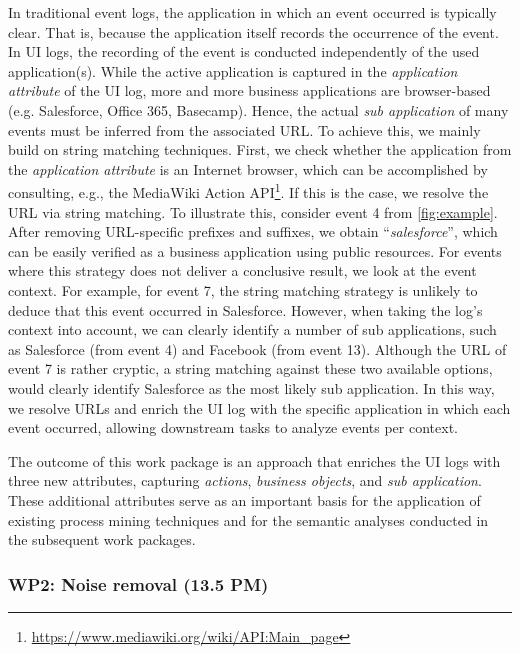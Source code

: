 In traditional event logs, the application in which an event occurred is typically clear. That is, because the application itself records the occurrence of the event. In UI logs, the recording of the event is conducted independently of the used application(s). While the active application is captured in the \textit{application attribute} of the UI log, more and more business applications are browser-based (e.g. Salesforce, Office 365, Basecamp). Hence, the actual \textit{sub application} of many events must be inferred from the associated URL. To achieve this, we mainly build on string matching techniques. First, we check whether the application from the \textit{application attribute} is an Internet browser, which can be accomplished by consulting, e.g., the 
MediaWiki Action API\footnote{\url{https://www.mediawiki.org/wiki/API:Main_page}}. If this is the case, we resolve the URL via string matching. To illustrate this, consider event 4 from \autoref{fig:example}. After removing URL-specific prefixes and suffixes, we obtain ``\textit{salesforce}'', which can be easily verified as a business application using public resources. For events where this strategy does not deliver a conclusive result, we look at the event context. For example, for event 7, the string matching strategy is unlikely to deduce that this event occurred in Salesforce. However, when taking the log's context into account, we can clearly identify a number of sub applications, such as Salesforce (from event 4) and Facebook (from event 13). Although the URL of event 7 is rather cryptic, a string matching against these two available options, would clearly identify Salesforce as the most likely sub application. In this way, we resolve URLs and enrich the UI log with the specific application in which each event occurred, allowing downstream tasks to analyze events per context.

 The outcome of this work package is an approach that enriches the UI logs with three new attributes, capturing \textit{actions}, \textit{business objects}, and \textit{sub application}. These additional attributes serve as an important basis for the application of existing process mining techniques and for the semantic analyses conducted in the subsequent work packages.  


\subsubsection{WP2:  Noise removal (13.5 PM)}
\label{sec:wp2}

